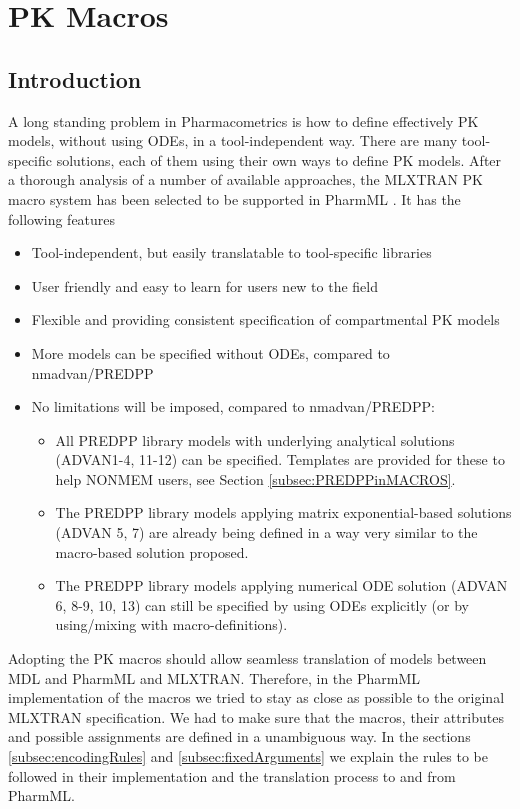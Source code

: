 \chapter{PK Macros}
\label{sec:PKMacros}

\section{Introduction}
A long standing problem in Pharmacometrics is how to define effectively PK models, 
without using ODEs, in a tool-independent way. There are many tool-specific solutions, 
each of them using their own ways to define PK models. 
After a thorough analysis of a number of available approaches, the MLXTRAN PK macro 
system has been selected to be supported in PharmML 
\cite{MLXTRANforMonolix:2014}.  It has the following features 
\begin{itemize}
\item
Tool-independent, but easily translatable to tool-specific libraries
\item
User friendly and easy to learn for users new to the field
\item
Flexible and providing consistent specification of compartmental PK models
\item
More models can be specified without ODEs, compared to nmadvan/PREDPP
\item
No limitations will be imposed, compared to nmadvan/PREDPP:
\begin{itemize}
\item
All PREDPP library models with underlying analytical solutions (ADVAN1-4, 11-12) can be specified. 
Templates are provided for these to help NONMEM users, see Section \ref{subsec:PREDPPinMACROS}.
\item
The PREDPP library models applying matrix exponential-based solutions (ADVAN 5, 7) are already 
being defined in a way very similar to the macro-based solution proposed.
\item
The PREDPP library models applying numerical ODE solution (ADVAN 6, 8-9, 10, 13) can still be 
specified by using ODEs explicitly (or by using/mixing with macro-definitions).
\end{itemize}
\end{itemize}

Adopting the PK macros should allow seamless translation of models between MDL and 
PharmML and MLXTRAN. Therefore, in the PharmML implementation of the macros we tried 
to stay as close as possible to the original MLXTRAN specification. We had to make sure 
that the macros, their attributes and possible assignments are defined in a unambiguous 
way. In the sections \ref{subsec:encodingRules} and \ref{subsec:fixedArguments} we 
explain the rules to be followed in their implementation and the translation process to and 
from PharmML.


